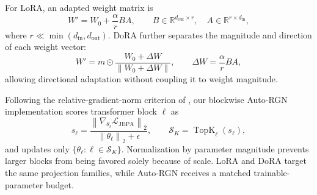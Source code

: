 For LoRA, an adapted weight matrix is
\[
W' = W_0 + \frac{\alpha}{r}BA,
\qquad
B\in\mathbb{R}^{d_{\mathrm{out}}\times r},
\quad
A\in\mathbb{R}^{r\times d_{\mathrm{in}}},
\]
where $r\ll\min(d_{\mathrm{in}},d_{\mathrm{out}})$. DoRA further separates the magnitude and direction of each weight vector:
\[
W'
=
m\odot
\frac{W_0+\Delta W}
{\left\|W_0+\Delta W\right\|},
\qquad
\Delta W=\frac{\alpha}{r}BA,
\]
allowing directional adaptation without coupling it to weight magnitude.

Following the relative-gradient-norm criterion of \citet{lee2023surgical}, our blockwise Auto-RGN implementation scores transformer block $\ell$ as
\[
s_\ell
=
\frac{
\left\|
\nabla_{\theta_\ell}\mathcal{L}_{\mathrm{JEPA}}
\right\|_2
}{
\left\|\theta_\ell\right\|_2+\epsilon
},
\qquad
\mathcal{S}_K
=
\operatorname{TopK}_{\ell}(s_\ell),
\]
and updates only $\{\theta_\ell:\ell\in\mathcal{S}_K\}$. Normalization by parameter magnitude prevents larger blocks from being favored solely because of scale. LoRA and DoRA target the same projection families, while Auto-RGN receives a matched trainable-parameter budget. 



















































